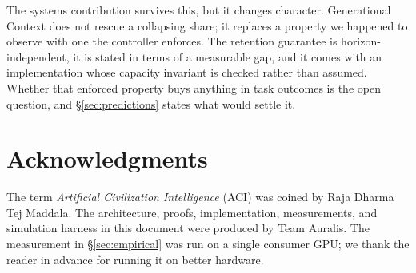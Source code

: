 \documentclass[11pt,a4paper]{article}
\theoremstyle{plain}
\theoremstyle{definition}
\theoremstyle{remark}
\begin{document}
The systems contribution survives this, but it changes character. Generational
Context does not rescue a collapsing share; it replaces a property we happened
to observe with one the controller enforces. The retention guarantee is
horizon-independent, it is stated in terms of a measurable gap, and it comes
with an implementation whose capacity invariant is checked rather than assumed.
Whether that enforced property buys anything in task outcomes is the open
question, and \S\ref{sec:predictions} states what would settle it.

\section*{Acknowledgments}

The term \emph{Artificial Civilization Intelligence} (ACI) was coined by Raja
Dharma Tej Maddala. The architecture, proofs, implementation, measurements, and
simulation harness in this document were produced by Team Auralis. The
measurement in \S\ref{sec:empirical} was run on a single consumer GPU; we thank
the reader in advance for running it on better hardware.
\end{document}
